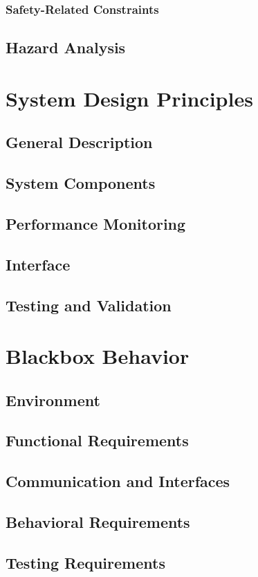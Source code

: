 \documentclass[12pt]{report}
\begin{document}
\subsection{Safety-Related Constraints}
\section{Hazard Analysis}

\chapter{System Design Principles}
\section{General Description}
\section{System Components}
\section{Performance Monitoring}
\section{Interface}
\section{Testing and Validation}

\chapter{Blackbox Behavior}
\section{Environment}
\section{Functional Requirements}
\section{Communication and Interfaces}
\section{Behavioral Requirements}
\section{Testing Requirements}
\end{document}
